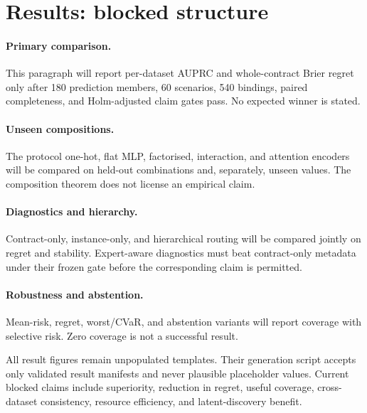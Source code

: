 \section{Results: blocked structure}




\paragraph{Primary comparison.}
 This paragraph will report per-dataset AUPRC and whole-contract Brier regret only after 180 prediction members, 60 scenarios, 540 bindings, paired completeness, and Holm-adjusted claim gates pass. No expected winner is stated.

\paragraph{Unseen compositions.}
 The protocol one-hot, flat MLP, factorised, interaction, and attention encoders will be compared on held-out combinations and, separately, unseen values. The composition theorem does not license an empirical claim.

\paragraph{Diagnostics and hierarchy.}
 Contract-only, instance-only, and hierarchical routing will be compared jointly on regret and stability. Expert-aware diagnostics must beat contract-only metadata under their frozen gate before the corresponding claim is permitted.

\paragraph{Robustness and abstention.}
 Mean-risk, regret, worst/CVaR, and abstention variants will report coverage with selective risk. Zero coverage is not a successful result.



All result figures remain unpopulated templates. Their generation script accepts only validated result manifests and never plausible placeholder values. Current blocked claims include superiority, reduction in regret, useful coverage, cross-dataset consistency, resource efficiency, and latent-discovery benefit.
